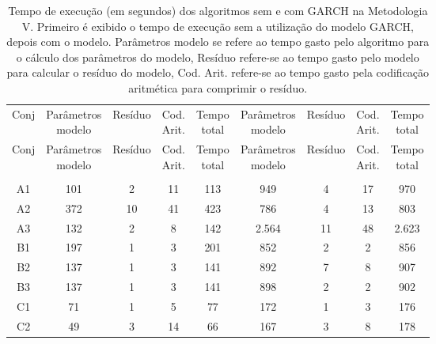 \begin{center}
\begin{longtable}{ccccc|cccc}
\toprule
\rowcolor{white}
\caption[Metodologia V: tempo de execução]{Tempo de execução (em segundos)
dos algoritmos sem e com GARCH na Metodologia V. Primeiro é exibido o tempo de
execução sem a utilização do modelo GARCH, depois com o modelo. Parâmetros
modelo se refere ao tempo gasto pelo algoritmo para o cálculo dos parâmetros do
modelo, Resíduo refere-se ao tempo gasto pelo modelo para calcular o resíduo do
modelo, Cod. Arit. refere-se ao tempo gasto pela codificação aritmética para
comprimir o resíduo.} \label{tab:EvolucaoEntropiaMet5}\\
\midrule
Conj & \specialcell{Parâmetros\\modelo} &
Resíduo & \specialcell{Cod.\\Arit.} & \specialcell{Tempo\\total} &
\specialcell{Parâmetros\\modelo} &
Resíduo & \specialcell{Cod.\\Arit.} & \specialcell{Tempo\\total} \\
\midrule
\endfirsthead 
\midrule
\rowcolor{white}
Conj & \specialcell{Parâmetros\\modelo} &
Resíduo & \specialcell{Cod.\\Arit.} & \specialcell{Tempo\\total} &
\specialcell{Parâmetros\\modelo} &
Resíduo & \specialcell{Cod.\\Arit.} & \specialcell{Tempo\\total} \\
\toprule
\endhead
\midrule \\ %
\endfoot
\bottomrule 
\endlastfoot
A1&101&2&11&113&949&4&17&970\\
A2&372&10&41&423&786&4&13&803\\
A3&132&2&8&142&2.564&11&48&2.623\\
B1&197&1&3&201&852&2&2&856\\
B2&137&1&3&141&892&7&8&907\\
B3&137&1&3&141&898&2&2&902\\
C1&71&1&5&77&172&1&3&176\\
C2&49&3&14&66&167&3&8&178\\

\end{longtable}
\end{center}
